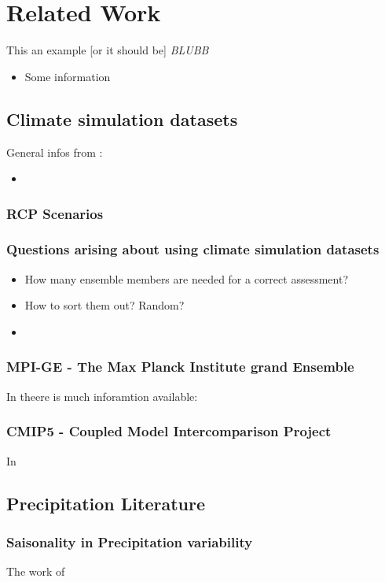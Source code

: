 \chapter{Related Work}

This an example [or it should be] \textit{BLUBB}
\begin{itemize}
  \item Some information 
	
\end{itemize}


\section{Climate simulation datasets}

General infos from \cite{mpige}:

\begin{itemize}
  \item 
	
\end{itemize}

\subsection{RCP Scenarios}

\subsection{Questions arising about using climate simulation datasets}

\begin{itemize}
  \item How many ensemble members are needed for a correct assessment?
  \item How to sort them out? Random?
  \item 
\end{itemize}

\subsection{MPI-GE - The Max Planck Institute grand Ensemble}

In \cite{mpige} theere is much inforamtion available:

\subsection{CMIP5 - Coupled Model Intercomparison Project}

In \cite{taylor2012overview_cmip5}


\section{Precipitation Literature}

\subsection{Saisonality in Precipitation variability}


The work of \citeauthor{precipitation_seasonality}

